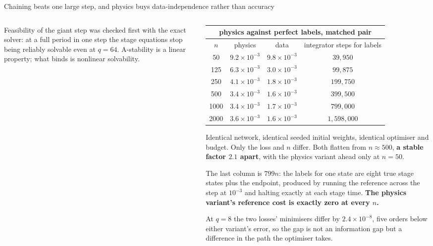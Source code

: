 \documentclass[aspectratio=169,10pt]{beamer}
\newcommand{\hl}[1]{{\color{accent}\textbf{#1}}}
\begin{document}
\begin{frame}[shrink=25]{Chaining beats one large step, and physics buys data-independence rather than accuracy}
\begin{columns}[T]
\begin{column}{0.5\textwidth}
{       Feasibility of the giant step was checked first with the exact solver: at
       a full period in one step the stage equations stop being reliably
       solvable even at $q = 64$. A-stability is a linear property; what binds
       is nonlinear solvability.}
    \end{column}
    \begin{column}{0.48\textwidth}
      \centering\scriptsize
      \begin{tabular}{@{}cccc@{}}
        \multicolumn{4}{c}{\textbf{physics against perfect labels, matched pair}}\\
        \toprule
        $n$ & physics & data & integrator steps for labels \\
        \midrule
        50   & $9.2\times10^{-3}$ & $9.8\times10^{-3}$ & $39{,}950$ \\
        125  & $6.3\times10^{-3}$ & $3.0\times10^{-3}$ & $99{,}875$ \\
        250  & $4.1\times10^{-3}$ & $1.8\times10^{-3}$ & $199{,}750$ \\
        500  & $3.4\times10^{-3}$ & $1.6\times10^{-3}$ & $399{,}500$ \\
        1000 & $3.4\times10^{-3}$ & $1.7\times10^{-3}$ & $799{,}000$ \\
        2000 & $3.6\times10^{-3}$ & $1.6\times10^{-3}$ & $1{,}598{,}000$ \\
        \bottomrule
      \end{tabular}
      \smallskip

      {\small Identical network, identical seeded initial weights, identical
       optimiser and budget. Only the loss and $n$ differ. Both flatten from
       $n \approx 500$, \hl{a stable factor $2.1$ apart}, with the physics
       variant ahead only at $n = 50$.
       \smallskip

       The last column is $799n$: the labels for one state are eight true stage
       states plus the endpoint, produced by running the reference across the
       step at $10^{-3}$ and halting exactly at each stage time. \hl{The physics
       variant's reference cost is exactly zero at every $n$.}
       \smallskip

       At $q = 8$ the two losses' minimisers differ by $2.4\times10^{-8}$, five
       orders below either variant's error, so the gap is not an information gap
       but a difference in the path the optimiser takes.}
    \end{column}
  \end{columns}
\end{frame}
\end{document}
